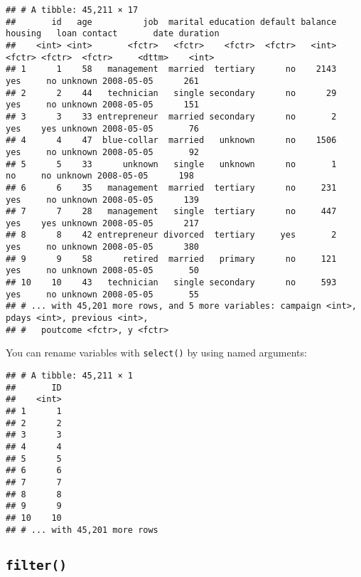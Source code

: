 \documentclass[]{book}
\newenvironment{Shaded}{\begin{snugshade}}{\end{snugshade}}
\newcommand{\KeywordTok}[1]{\textcolor[rgb]{0.13,0.29,0.53}{\textbf{{#1}}}}
\newcommand{\DataTypeTok}[1]{\textcolor[rgb]{0.13,0.29,0.53}{{#1}}}
\newcommand{\StringTok}[1]{\textcolor[rgb]{0.31,0.60,0.02}{{#1}}}
\newcommand{\CommentTok}[1]{\textcolor[rgb]{0.56,0.35,0.01}{\textit{{#1}}}}
\newcommand{\NormalTok}[1]{{#1}}
\begin{document}
\begin{verbatim}
## # A tibble: 45,211 × 17
##       id   age          job  marital education default balance housing   loan contact       date duration
##    <int> <int>       <fctr>   <fctr>    <fctr>  <fctr>   <int>  <fctr> <fctr>  <fctr>     <dttm>    <int>
## 1      1    58   management  married  tertiary      no    2143     yes     no unknown 2008-05-05      261
## 2      2    44   technician   single secondary      no      29     yes     no unknown 2008-05-05      151
## 3      3    33 entrepreneur  married secondary      no       2     yes    yes unknown 2008-05-05       76
## 4      4    47  blue-collar  married   unknown      no    1506     yes     no unknown 2008-05-05       92
## 5      5    33      unknown   single   unknown      no       1      no     no unknown 2008-05-05      198
## 6      6    35   management  married  tertiary      no     231     yes     no unknown 2008-05-05      139
## 7      7    28   management   single  tertiary      no     447     yes    yes unknown 2008-05-05      217
## 8      8    42 entrepreneur divorced  tertiary     yes       2     yes     no unknown 2008-05-05      380
## 9      9    58      retired  married   primary      no     121     yes     no unknown 2008-05-05       50
## 10    10    43   technician   single secondary      no     593     yes     no unknown 2008-05-05       55
## # ... with 45,201 more rows, and 5 more variables: campaign <int>, pdays <int>, previous <int>,
## #   poutcome <fctr>, y <fctr>
\end{verbatim}

You can rename variables with \texttt{select()} by using named
arguments:

\begin{Shaded}
\end{Shaded}

\begin{verbatim}
## # A tibble: 45,211 × 1
##       ID
##    <int>
## 1      1
## 2      2
## 3      3
## 4      4
## 5      5
## 6      6
## 7      7
## 8      8
## 9      9
## 10    10
## # ... with 45,201 more rows
\end{verbatim}

\clearpage

\subsection{\texorpdfstring{\texttt{filter()}}{filter()}}\label{filter}
\end{document}
